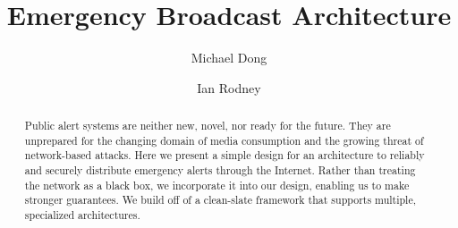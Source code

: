 \documentclass[sigconf]{acmart}
\begin{document}
\title{Emergency Broadcast Architecture}


\author{Michael Dong}
\author{Ian Rodney}

\renewcommand{\shortauthors}{M. Dong, I. Rodney}

\begin{abstract}
    Public alert systems are neither new, novel, nor ready for the future. They are unprepared for the changing domain of media consumption and the growing threat of network-based attacks. Here we present a simple design for an architecture to reliably and securely distribute emergency alerts through the Internet. Rather than treating the network as a black box, we incorporate it into our design, enabling us to make stronger guarantees. We build off of a clean-slate framework that supports multiple, specialized architectures. 
\end{abstract}

\maketitle




\newpage


\end{document}

